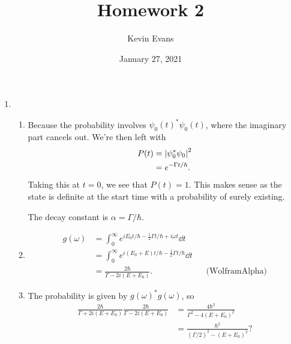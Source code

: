\documentclass{homework}
\title{Homework 2}
\author{Kevin Evans}
\date{January 27, 2021}
\begin{document}
	\maketitle
	\begin{enumerate}
		\item \begin{enumerate}
			\item Because the probability involves $\psi_0(t)^* \psi_0(t)$, where the imaginary part cancels out. We're then left with \begin{align*}
				P(t) & = \abs{ \psi_0^* \psi_0 }^2 \\
					& = e^{-\Gamma t / \hbar} .
			\end{align*}
			Taking this at $t=0$, we see that $P(t)=1$. This makes sense as the state is definite at the start time with a probability of surely existing.
			
			The decay constant is $\alpha = \Gamma/\hbar$.
			
			\item \begin{align*}
				g(\omega) & = \int_0^\infty e^{iE_0t / \hbar - \frac{1}{2} \Gamma t / \hbar + i \omega t} \dd{t} \\
					& = \int_0^\infty e^{i (E_0 + E) t / \hbar - \frac{1}{2} \Gamma t / \hbar } \dd{t} \\
					& = \frac{2 \hbar}{\Gamma - 2i(E + E_0)}. && \text{(WolframAlpha)}
			\end{align*}
		
			\item The probability is given by $g(\omega)^* g(\omega)$, so \begin{align*}
				 \frac{2 \hbar}{\Gamma + 2i(E + E_0)}  \frac{2 \hbar}{\Gamma - 2i(E + E_0)} & = \frac{4 \hbar^2}{\Gamma^2 - 4(E+E_0)^2} \\
				 & = \frac{\hbar^2}{(\Gamma/2)^2 - (E + E_0)^2}?
			\end{align*}
		\end{enumerate}
		

\end{enumerate}
\end{document}
